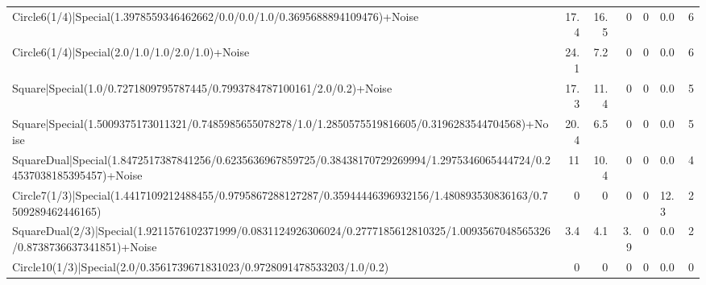 \begin{tabular}{lrrrrlr}
 Circle6(1/4)|Special(1.3978559346462662/0.0/0.0/1.0/0.3695688894109476)+Noise                                                 &            17.4 &           16.5 &             0   &             0   & 0.0             &            6 \\
 Circle6(1/4)|Special(2.0/1.0/1.0/2.0/1.0)+Noise                                                                               &            24.1 &            7.2 &             0   &             0   & 0.0             &            6 \\
 Square|Special(1.0/0.7271809795787445/0.7993784787100161/2.0/0.2)+Noise                                                       &            17.3 &           11.4 &             0   &             0   & 0.0             &            5 \\
 Square|Special(1.5009375173011321/0.7485985655078278/1.0/1.2850575519816605/0.3196283544704568)+Noise                         &            20.4 &            6.5 &             0   &             0   & 0.0             &            5 \\
 SquareDual|Special(1.8472517387841256/0.6235636967859725/0.38438170729269994/1.2975346065444724/0.24537038185395457)+Noise    &            11   &           10.4 &             0   &             0   & 0.0             &            4 \\
 Circle7(1/3)|Special(1.4417109212488455/0.9795867288127287/0.35944446396932156/1.480893530836163/0.7509289462446165)          &             0   &            0   &             0   &             0   & 12.3            &            2 \\
 SquareDual(2/3)|Special(1.9211576102371999/0.0831124926306024/0.2777185612810325/1.0093567048565326/0.8738736637341851)+Noise &             3.4 &            4.1 &             3.9 &             0   & 0.0             &            2 \\
 Circle10(1/3)|Special(2.0/0.3561739671831023/0.9728091478533203/1.0/0.2)                                                      &             0   &            0   &             0   &             0   & 0.0             &            0 \\
\hline
\end{tabular}